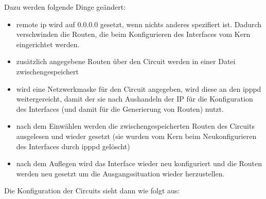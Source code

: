 Dazu werden folgende Dinge geändert:
\begin{itemize}

\item remote ip wird auf 0.0.0.0 gesetzt, wenn nichts anderes spezifiert
  ist. Dadurch verschwinden die Routen, die beim Konfigurieren des
  Interfaces vom Kern eingerichtet werden.

\item zusätzlich angegebene Routen über den Circuit werden in einer Datei
  zwischengespeichert

\item wird eine Netzwerkmaske für den Circuit angegeben, wird diese an den
  ipppd weitergereicht, damit der sie nach Aushandeln der IP für die
  Konfiguration des Interfaces (und damit für die Generierung von
  Routen) nutzt.

\item nach dem Einwählen werden die zwischengespeicherten Routen des
  Circuits ausgelesen und wieder gesetzt (sie wurden vom Kern beim
  Neukonfigurieren des Interfaces durch ipppd gelöscht)

\item nach dem Auflegen wird das Interface wieder neu konfiguriert und die
  Routen werden neu gesetzt um die Ausgangssituation wieder
  herzustellen.
\end{itemize}

Die Konfiguration der Circuits sieht dann wie folgt aus:

